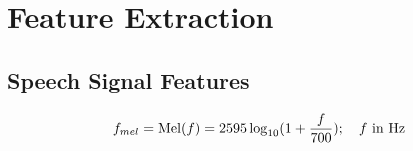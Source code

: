 \chapter{Feature Extraction}

\section{Speech Signal Features}

\begin{equation}
\label{eq:mel-function}
f_{mel} = \operatorname{Mel}(f) = 2595 \log_{10} (1 + \frac{f}{700}); \quad f \text{ in Hz}
\end{equation}
